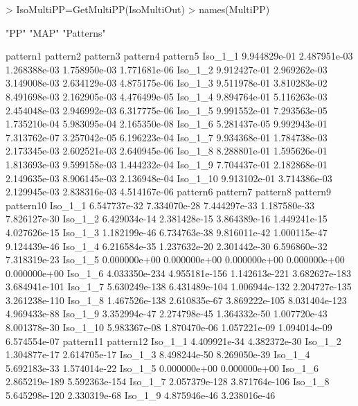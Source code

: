 \documentclass{article}
\begin{document}
\begin{Schunk}
\begin{Sinput}
> IsoMultiPP=GetMultiPP(IsoMultiOut)
> names(MultiPP)
\end{Sinput}
\begin{Soutput}
[1] "PP"       "MAP"      "Patterns"
\end{Soutput}
\begin{Soutput}
             pattern1     pattern2     pattern3     pattern4     pattern5
Iso_1_1  9.944829e-01 2.487951e-03 1.268388e-03 1.758950e-03 1.771681e-06
Iso_1_2  9.912427e-01 2.969262e-03 3.149008e-03 2.634129e-03 4.875175e-06
Iso_1_3  9.511978e-01 3.810283e-02 8.491698e-03 2.162905e-03 4.476499e-05
Iso_1_4  9.894764e-01 5.116263e-03 2.454048e-03 2.946992e-03 6.317775e-06
Iso_1_5  9.991552e-01 7.293563e-05 1.735210e-04 5.983095e-04 2.165350e-08
Iso_1_6  5.281437e-05 9.992943e-01 7.313762e-07 3.257042e-05 6.196223e-04
Iso_1_7  9.934368e-01 1.784738e-03 2.173345e-03 2.602521e-03 2.640945e-06
Iso_1_8  8.288801e-01 1.595626e-01 1.813693e-03 9.599158e-03 1.444232e-04
Iso_1_9  7.704437e-01 2.182868e-01 2.149635e-03 8.906145e-03 2.136948e-04
Iso_1_10 9.913102e-01 3.714386e-03 2.129945e-03 2.838316e-03 4.514167e-06
              pattern6      pattern7      pattern8      pattern9     pattern10
Iso_1_1   6.547737e-32  7.334070e-28  7.444297e-33  1.187580e-33  7.826127e-30
Iso_1_2   6.429034e-14  2.381428e-15  3.864389e-16  1.449241e-15  4.027626e-15
Iso_1_3   1.182199e-46  6.734763e-38  9.816011e-42  1.000115e-47  9.124439e-46
Iso_1_4   6.216584e-35  1.237632e-20  2.301442e-30  6.596860e-32  7.318319e-23
Iso_1_5   0.000000e+00  0.000000e+00  0.000000e+00  0.000000e+00  0.000000e+00
Iso_1_6  4.033350e-234 4.955181e-156 1.142613e-221 3.682627e-183 3.684941e-101
Iso_1_7  5.630249e-138 6.431489e-104 1.006944e-132 2.204727e-135 3.261238e-110
Iso_1_8  1.467526e-138  2.610835e-67 3.869222e-105 8.031404e-123  4.969433e-88
Iso_1_9   3.352994e-47  2.274798e-45  1.364332e-50  1.007720e-43  8.001378e-30
Iso_1_10  5.983367e-08  1.870470e-06  1.057221e-09  1.094014e-09  6.574554e-07
             pattern11     pattern12
Iso_1_1   4.409921e-34  4.382372e-30
Iso_1_2   1.304877e-17  2.614705e-17
Iso_1_3   8.498244e-50  8.269050e-39
Iso_1_4   5.692183e-33  1.574014e-22
Iso_1_5   0.000000e+00  0.000000e+00
Iso_1_6  2.865219e-189 5.592363e-154
Iso_1_7  2.057379e-128 3.871764e-106
Iso_1_8  5.645298e-120  2.330319e-68
Iso_1_9   4.875946e-46  3.238016e-46

\end{Soutput}
\end{Schunk}
\end{document}
